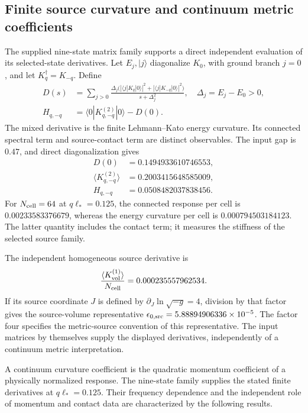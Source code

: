 \subsection{Finite source curvature and continuum metric coefficients}\label{sec:finite-gravity-rank}
The supplied nine-state matrix family supports a direct independent evaluation of its selected-state derivatives. Let $E_j,|j\rangle$ diagonalize $K_0$, with ground branch $j=0$, and let $K_q^\dagger=K_{-q}$. Define
\begin{align}
D(s)&=\sum_{j>0}\frac{\Delta_j\bigl(|\langle j|K_q|0\rangle|^2+|\langle j|K_{-q}|0\rangle|^2\bigr)}{s+\Delta_j^2},
\quad \Delta_j=E_j-E_0>0,\\
H_{q,-q}&=\langle0|K_{q,-q}^{(2)}|0\rangle-D(0).
\end{align}
The mixed derivative is the finite Lehmann--Kato energy curvature. Its connected spectral term and source-contact term are distinct observables. The input gap is $0.47$, and direct diagonalization gives
\begin{equation}\label{eq:finite-source-numbers}
\boxed{\begin{aligned}
D(0)&=0.1494933610746553,\\
\langle K_{q,-q}^{(2)}\rangle&=0.2003415648585009,\\
H_{q,-q}&=0.0508482037838456.
\end{aligned}}
\end{equation}
For $N_{\rm cell}=64$ at $q\ell_*=0.125$, the connected response per cell is $0.00233583376679$, whereas the energy curvature per cell is $0.000794503184123$. The latter quantity includes the contact term; it measures the stiffness of the selected source family.

The independent homogeneous source derivative is
\[
\frac{\langle K_{\rm vol}^{(1)}\rangle}{N_{\rm cell}}
=0.000235557962534.
\]
If its source coordinate $J$ is defined by $\partial_J\ln\sqrt{-g}=4$, division by that factor gives the source-volume representative $\epsilon_{0,\rm src}=5.88894906336\times10^{-5}$. The factor four specifies the metric-source convention of this representative. The input matrices by themselves supply the displayed derivatives, independently of a continuum metric interpretation.

A continuum curvature coefficient is the quadratic momentum coefficient of a physically normalized response. The nine-state family supplies the stated finite derivatives at $q\ell_*=0.125$. Their frequency dependence and the independent role of momentum and contact data are characterized by the following results.

